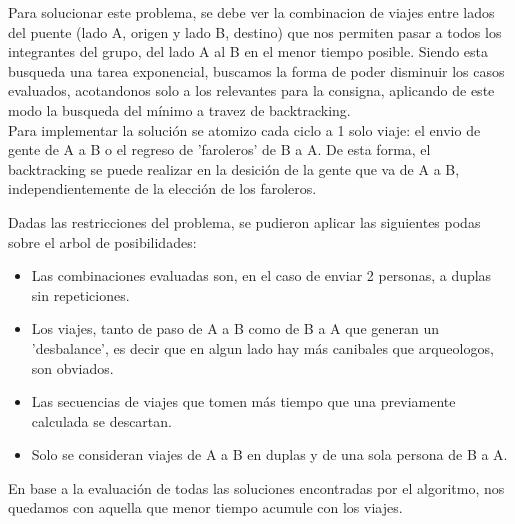 Para solucionar este problema, se debe ver la combinacion de viajes entre lados del puente (lado A, origen y lado B, destino) que nos permiten pasar a todos los integrantes
del grupo, del lado A al B en el menor tiempo posible. Siendo esta busqueda una tarea exponencial, buscamos la forma de poder disminuir los casos evaluados, acotandonos solo a los relevantes
para la consigna, aplicando de este modo la busqueda del mínimo a travez de backtracking.\\

Para implementar la solución se atomizo cada ciclo a 1 solo viaje: el envio de gente de A a B o el regreso de 'faroleros' de B a A. De esta forma, el backtracking se puede realizar en 
la desición de la gente que va de A a B, independientemente de la elección de los faroleros.

Dadas las restricciones del problema, se pudieron aplicar las siguientes podas sobre el arbol de posibilidades:
\begin{itemize}
	\item Las combinaciones evaluadas son, en el caso de enviar 2 personas, a duplas sin repeticiones.
	\item Los viajes, tanto de paso de A a B como de B a A que generan un 'desbalance', es decir que en algun lado hay más canibales que arqueologos, son obviados.
	\item Las secuencias de viajes que tomen más tiempo que una previamente calculada se descartan.
	\item Solo se consideran viajes de A a B en duplas y de una sola persona de B a A.
\end{itemize}

En base a la evaluación de todas las soluciones encontradas por el algoritmo, nos quedamos con aquella que menor tiempo acumule con los viajes.